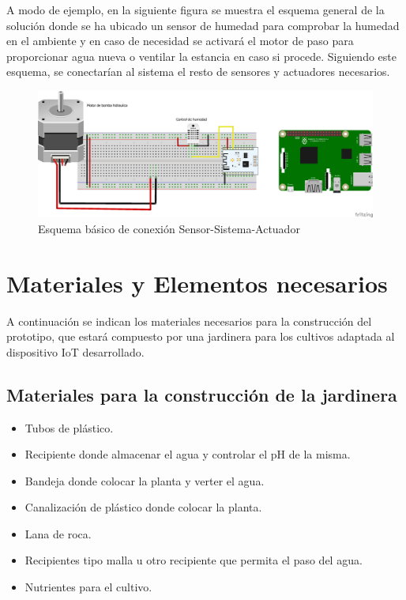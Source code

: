 \documentclass[12pt,a4paper,titlepage,oneside]{report}
\begin{document}
	A modo de ejemplo, en la siguiente figura se muestra el esquema general de la solución donde se ha ubicado un sensor de humedad para comprobar la humedad en el ambiente y en caso de necesidad se activará el motor de paso para proporcionar agua nueva o ventilar la estancia en caso si procede. Siguiendo este esquema, se conectarían al sistema el resto de sensores y actuadores necesarios.
	
	\begin{figure}
		\center
		\includegraphics[scale=0.5]{./images/Conexion.png}
		\caption{Esquema básico de conexión Sensor-Sistema-Actuador}
		\label{Esquema_basico}
	\end{figure}		
	
	
	\section{Materiales y Elementos necesarios}
	A continuación se indican los materiales necesarios para la construcción del prototipo, que estará compuesto por una jardinera para los cultivos adaptada al dispositivo IoT desarrollado.\cite{2014}

	\subsection*{Materiales para la construcción de la jardinera}

		\begin{itemize}
			\item Tubos de plástico.
			\item Recipiente donde almacenar el agua y controlar el pH de la misma.
			\item Bandeja donde colocar la planta y verter el agua.
			\item Canalización de plástico donde colocar la planta.
			\item Lana de roca.
			\item Recipientes tipo malla u otro recipiente que permita el paso del agua.
			\item Nutrientes para el cultivo.
		\end{itemize}			
	
\end{document}
